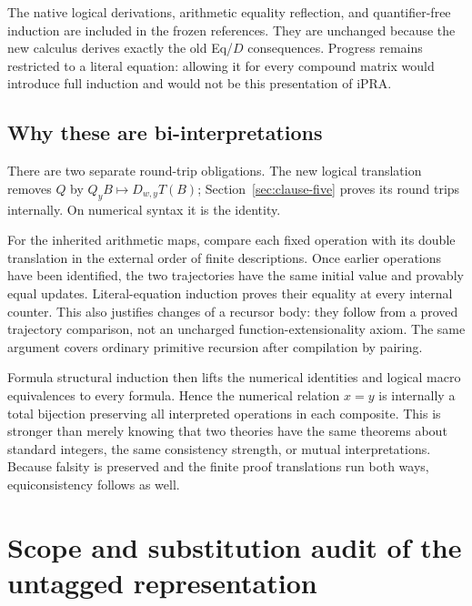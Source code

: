 \documentclass[11pt,letterpaper]{article}
\theoremstyle{definition}\newtheorem{definition}[theorem]{Definition}
\begin{document}
The native logical derivations, arithmetic equality reflection, and quantifier-free induction are included in the frozen references. They are unchanged because the new calculus derives exactly the old Eq/$D$ consequences. Progress remains restricted to a literal equation: allowing it for every compound matrix would introduce full induction and would not be this presentation of iPRA.

\subsection{Why these are bi-interpretations}
There are two separate round-trip obligations. The new logical translation removes $Q$ by $Q_yB\mapsto D_{w,y}T(B)$; Section~\ref{sec:clause-five} proves its round trips internally. On numerical syntax it is the identity.

For the inherited arithmetic maps, compare each fixed operation with its double translation in the external order of finite descriptions. Once earlier operations have been identified, the two trajectories have the same initial value and provably equal updates. Literal-equation induction proves their equality at every internal counter. This also justifies changes of a recursor body: they follow from a proved trajectory comparison, not an uncharged function-extensionality axiom. The same argument covers ordinary primitive recursion after compilation by pairing.

Formula structural induction then lifts the numerical identities and logical macro equivalences to every formula. Hence the numerical relation $x=y$ is internally a total bijection preserving all interpreted operations in each composite. This is stronger than merely knowing that two theories have the same theorems about standard integers, the same consistency strength, or mutual interpretations. Because falsity is preserved and the finite proof translations run both ways, equiconsistency follows as well.

\section{Scope and substitution audit of the untagged representation}
\end{document}
